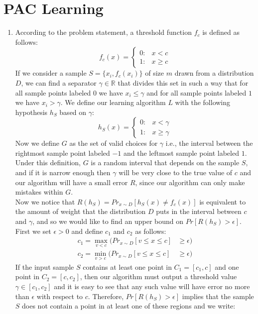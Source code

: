 \documentclass{article}
\begin{document}
\section{PAC Learning}
    \begin{enumerate}[1.]
        \item According to the problem statement, a threshold function $f_c$ is defined as follows:
        \[
        f_c(x)=
        \begin{cases} 
            0: & x < c \\
            1: & x \geq c
        \end{cases}
        \]
        If we consider a sample $S = \{x_i, f_c(x_i)\}$ of size $m$ drawn from a distribution $D$, we can find a separator $\gamma \in \mathbb{R}$ that divides this set in such a way that for all sample points labeled $0$ we have $x_i \leq \gamma$ and for all sample points labeled $1$ we have $x_i > \gamma$.
        We define our learning algorithm $L$ with the following hypothesis $h_S$ based on $\gamma$:
        \[
        h_S(x)=
        \begin{cases} 
            0: & x < \gamma \\
            1: & x \geq \gamma
        \end{cases}
        \]
        Now we define $G$ as the set of valid choices for $\gamma$ i.e., the interval between the rightmost sample point labeled $-1$ and the leftmost sample point labeled $1$. Under this definition, $G$ is a random interval that depends on the sample $S$, and if it is narrow enough then $\gamma$ will be very close to the true value of $c$ and our algorithm will have a small error $R$, since our algorithm can only make mistakes within $G$.\\
        Now we notice that $R(h_S) = Pr_{x \sim D}[h_S(x) \neq f_c(x)]$ is equivalent to the amount of weight that the distribution $D$ puts in the interval between $c$ and $\gamma$, and so we would like to find an upper bound on $Pr[R(h_S) > \epsilon]$.\\
        First we set $\epsilon > 0$ and define $c_1$ and $c_2$ as follows:
        \begin{align*}
            c_1 = \max_{v < c}(Pr_{x \sim D}[v \leq x \leq c] &\geq \epsilon)\\
            c_2 = \min_{v > c}(Pr_{x \sim D}[v \leq x \leq c] &\geq \epsilon)
        \end{align*}
        If the input sample $S$ contains at least one point in $C_1=[c_1,c]$ and one point in $C_2=[c,c_2]$, then our algorithm must output a threshold value $\gamma \in [c_1, c_2]$ and it is easy to see that any such value will have error no more than $\epsilon$ with respect to $c$. Therefore, $Pr[R(h_S) > \epsilon]$ implies that the sample $S$ does not contain a point in at least one of these regions and we write:

\end{enumerate}
\end{document}
